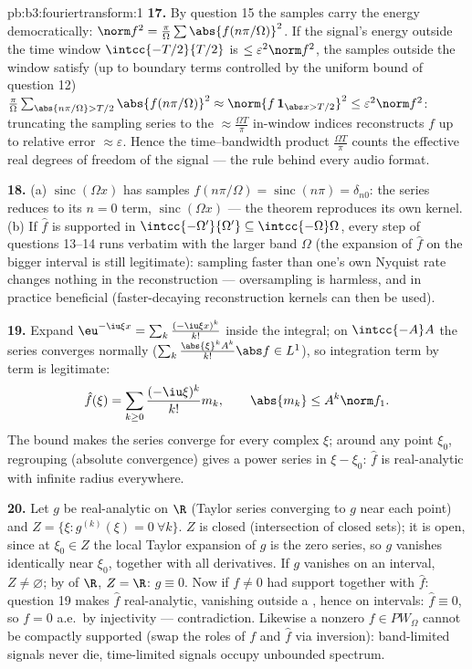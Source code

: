 \begin{solution}{pb:b3:fouriertransform:1}
\textbf{17.} By question 15 the samples carry the energy
democratically: $\norm f^2 = \frac\pi\Omega\sum
\abs{f(n\pi/\Omega)}^2$. If the signal's energy outside the
time window $\intcc{-T/2}{T/2}$ is $\leq \varepsilon^2\norm
f^2$, the samples outside the window satisfy (up to boundary
terms controlled by the uniform bound of question 12)
$\frac\pi\Omega\sum_{\abs{n\pi/\Omega} > T/2}
\abs{f(n\pi/\Omega)}^2 \approx \norm{f\,\mathbf 1_{\abs x >
T/2}}^2 \leq \varepsilon^2\norm f^2$: truncating the
sampling series to the $\approx \frac{\Omega T}\pi$
in-window indices reconstructs $f$ up to relative error
$\approx\varepsilon$. Hence the time--bandwidth product
$\frac{\Omega T}{\pi}$ counts the effective real degrees of
freedom of the signal --- the rule behind every audio
format.

\textbf{18.} (a) $\operatorname{sinc}(\Omega x)$ has
samples $f(n\pi/\Omega) = \operatorname{sinc}(n\pi) =
\delta_{n0}$: the series reduces to its $n = 0$ term,
$\operatorname{sinc}(\Omega x)$ --- the theorem reproduces
its own kernel. (b) If $\hat f$ is supported in
$\intcc{-\Omega'}{\Omega'} \subseteq
\intcc{-\Omega}\Omega$, every step of questions 13--14 runs
verbatim with the larger band $\Omega$ (the expansion of
$\hat f$ on the bigger interval is still legitimate):
sampling faster than one's own Nyquist rate changes nothing
in the reconstruction --- oversampling is harmless, and in
practice beneficial (faster-decaying reconstruction kernels
can then be used).

\textbf{19.} Expand $\eu^{-\iu\xi x} =
\sum_k\frac{(-\iu\xi x)^k}{k!}$ inside the integral; on
$\intcc{-A}A$ the series converges normally
($\sum_k\frac{\abs{\xi}^kA^k}{k!}\abs f \in L^1$), so
integration term by term is legitimate:
\[
\hat f(\xi) = \sum_{k\geq0}\frac{(-\iu\xi)^k}{k!}m_k,
\qquad \abs{m_k} \leq A^k\norm f_1 .
\]
The bound makes the series converge for every complex $\xi$;
around any point $\xi_0$, regrouping (absolute convergence)
gives a power series in $\xi - \xi_0$: $\hat f$ is
real-analytic with infinite radius everywhere.

\textbf{20.} Let $g$ be real-analytic on $\R$ (Taylor series
converging to $g$ near each point) and $Z = \{\xi :
g^{(k)}(\xi) = 0\ \forall k\}$. $Z$ is closed (intersection
of closed sets); it is open, since at $\xi_0 \in Z$ the local
Taylor expansion of $g$ is the zero series, so $g$ vanishes
identically near $\xi_0$, together with all derivatives. If
$g$ vanishes on an interval, $Z \neq \varnothing$; by
 of $\R$, $Z = \R$: $g \equiv 0$. Now if $f
\neq 0$ had  support together with $\hat f$: question
19 makes $\hat f$ real-analytic, vanishing outside a ,
hence on intervals: $\hat f \equiv 0$, so $f = 0$ a.e.\ by
injectivity --- contradiction. Likewise a nonzero $f \in
PW_\Omega$ cannot be compactly supported (swap the roles of
$f$ and $\hat f$ via inversion): band-limited signals never
die, time-limited signals occupy unbounded spectrum.


\end{solution}

